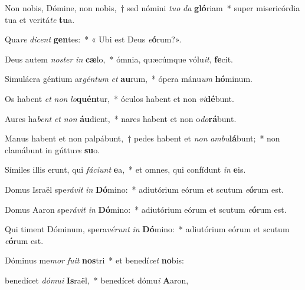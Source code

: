 \item Non nobis, Dómine, non nobis,~† sed nómini \textit{tuo} \textit{da} \textbf{gló}riam~* super misericórdia tua et veritá\textit{te} \textbf{tu}a.

\item Qua\textit{re} \textit{dicent} \textbf{gen}tes:~* « Ubi est Deus \textit{e}\textbf{ó}rum?».

\item Deus autem \textit{noster} \textit{in} \textbf{cæ}lo,~* ómnia, quæcúmque vólu\textit{it}, \textbf{fe}cit.

\item Simulácra géntium ar\textit{géntum} \textit{et} \textbf{au}rum,~* ópera mánu\textit{um} \textbf{hó}minum.

\item Os habent \textit{et} \textit{non} \textit{lo}\textbf{quén}tur,~* óculos habent et non \textit{vi}\textbf{dé}bunt.

\item Aures ha\textit{bent} \textit{et} \textit{non} \textbf{áu}dient,~* nares habent et non o\textit{do}\textbf{rá}bunt.

\item Manus habent et non palpábunt,~† pedes habent et \textit{non} \textit{ambu}\textbf{lá}bunt;~* non clamábunt in gúttu\textit{re} \textbf{su}o.

\item Símiles illis erunt, qui \textit{fáciunt} \textbf{e}a,~* et omnes, qui confídunt \textit{in} \textbf{e}is.

\item Domus Israël spe\textit{rávit} \textit{in} \textbf{Dó}mino:~* adiutórium eórum et scutum \textit{e}\textbf{ó}rum est.

\item Domus Aaron spe\textit{rávit} \textit{in} \textbf{Dó}mino:~* adiutórium eórum et scutum \textit{e}\textbf{ó}rum est.

\item Qui timent Dóminum, spera\textit{vérunt} \textit{in} \textbf{Dó}mino:~* adiutórium eórum et scutum \textit{e}\textbf{ó}rum est.

\item Dóminus me\textit{mor} \textit{fuit} \textbf{nos}tri~* et benedí\textit{cet} \textbf{no}bis:

\item benedícet \textit{dómui} \textbf{Is}raël,~* benedícet dómu\textit{i} \textbf{A}aron,

